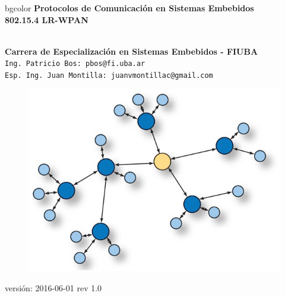 \documentclass[aspectratio=169, handout]{beamer}
\begin{document}
\begingroup
\makeatletter
\setlength{\hoffset}{-.5\beamer@sidebarwidth}
\makeatother
\begin{frame}
\begin{center}
\hfill
    \begin{beamercolorbox}[center,dp=3ex,ht=10.25ex, wd=1\linewidth]{bgcolor}
        \Large\textbf{Protocolos de Comunicación en Sistemas Embebidos}\\
        \huge\textbf{802.15.4 LR-WPAN}
    \end{beamercolorbox}
\hfill\hfill
\\
\vspace{5px}
\textbf{Carrera de Especialización en Sistemas Embebidos - FIUBA}\\
\vspace{10px}
\texttt{Ing. Patricio Bos: pbos@fi.uba.ar}\\
\texttt{Esp. Ing. Juan Montilla: juanvmontillac@gmail.com}\\

\vspace{10px}

\begin{figure}[H]
	\includegraphics[width=.3\textwidth]{./imagenes/red.jpg}
\end{figure}	

\vspace{5px}
\tiny versión: 2016-06-01 rev 1.0 
 	  	
\end{center}
\end{frame}
\endgroup
\end{document}
